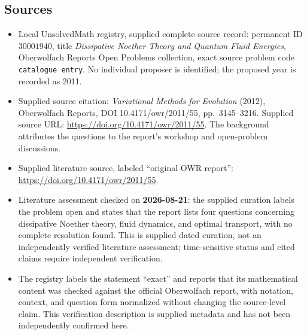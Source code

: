 \documentclass[11pt]{article}
\begin{document}
\subsection{Sources}
\begin{itemize}
\item Local UnsolvedMath registry, supplied complete source record: permanent ID \(30001940\), title \emph{Dissipative Noether Theory and Quantum Fluid Energies}, Oberwolfach Reports Open Problems collection, exact source problem code \texttt{catalogue entry}. No individual proposer is identified; the proposed year is recorded as 2011.
\item Supplied source citation: \emph{Variational Methods for Evolution} (2012), Oberwolfach Reports, DOI 10.4171/owr/2011/55, pp.\ 3145--3216. Supplied source URL: \url{https://doi.org/10.4171/owr/2011/55}. The background attributes the questions to the report's workshop and open-problem discussions.
\item Supplied literature source, labeled ``original OWR report'': \url{https://doi.org/10.4171/owr/2011/55}.
\item Literature assessment checked on \textbf{2026-08-21}: the supplied curation labels the problem open and states that the report lists four questions concerning dissipative Noether theory, fluid dynamics, and optimal transport, with no complete resolution found. This is supplied dated curation, not an independently verified literature assessment; time-sensitive status and cited claims require independent verification.
\item The registry labels the statement ``exact'' and reports that its mathematical content was checked against the official Oberwolfach report, with notation, context, and question form normalized without changing the source-level claim. This verification description is supplied metadata and has not been independently confirmed here.
\end{itemize}
\end{document}
